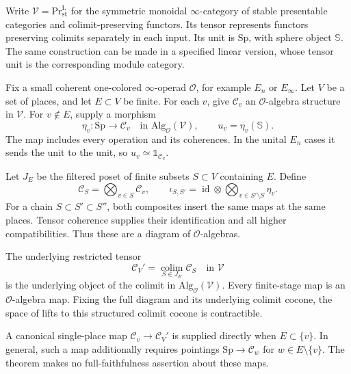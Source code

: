 Write \(\mathcal V=\mathrm{Pr}^{\mathrm L}_{\mathrm{st}}\) for the
symmetric monoidal \(\infty\)-category of stable presentable categories
and colimit-preserving functors. Its tensor represents functors
preserving colimits separately in each input. Its unit is
\(\mathrm{Sp}\), with sphere object \(\mathbb S\).
The same construction can be made in a specified linear version,
whose tensor unit is the corresponding module category.

Fix a small coherent one-colored \(\infty\)-operad \(\mathcal O\),
for example \(E_n\) or \(E_\infty\). Let \(V\) be a set of places,
and let \(E\subset V\) be finite. For each \(v\), give
\(\mathcal C_v\) an \(\mathcal O\)-algebra structure in \(\mathcal V\).
For \(v\notin E\), supply a morphism
\[
 \eta_v:\mathrm{Sp}\longrightarrow\mathcal C_v
       \quad\text{in }\mathrm{Alg}_{\mathcal O}(\mathcal V),
 \qquad u_v=\eta_v(\mathbb S).
\]
The map includes every operation and its coherences. In the unital
\(E_n\) cases it sends the unit to the unit, so
\(u_v\simeq\mathbb 1_{\mathcal C_v}\).

Let \(J_E\) be the filtered poset of finite subsets \(S\subset V\)
containing \(E\). Define
\[
 \mathcal C_S=\bigotimes_{v\in S}\mathcal C_v,\qquad
 \iota_{S,S'}=
 \operatorname{id}\otimes\bigotimes_{v\in S'\setminus S}\eta_v.
\]
For a chain \(S\subset S'\subset S''\), both composites insert
the same maps at the same places. Tensor coherence supplies their
identification and all higher compatibilities. Thus these are a
diagram of \(\mathcal O\)-algebras.

\begin{theorem}\label{v4-arith:ic:restricted-colimit}
The underlying restricted tensor
\[
 \mathcal C_V'=\operatorname*{colim}_{S\in J_E}\mathcal C_S
       \quad\text{in }\mathcal V
\]
is the underlying object of the colimit in
\(\mathrm{Alg}_{\mathcal O}(\mathcal V)\).
Every finite-stage map is an \(\mathcal O\)-algebra map.
Fixing the full diagram and its underlying colimit cocone, the
space of lifts to this structured colimit cocone is contractible.

A canonical single-place map \(\mathcal C_v\to\mathcal C_V'\)
is supplied directly when \(E\subset\{v\}\).
In general, such a map additionally requires pointings
\(\mathrm{Sp}\to\mathcal C_w\) for \(w\in E\setminus\{v\}\).
The theorem makes no full-faithfulness assertion about these maps.
\end{theorem}

